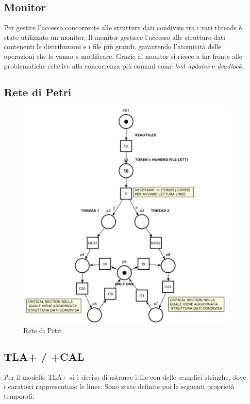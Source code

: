 \documentclass{article}
\begin{document}
\subsection{Monitor}
Per gestire l'accesso concorrente alle strutture dati condivise tra i vari threads è stato utilizzato un monitor.
Il monitor gestisce l'accesso alle strutture dati contenenti le distribuzioni e i file più grandi, garantendo l'atomicità delle operazioni che le vanno a modificare.
Grazie al monitor si riesce a far fronte alle problematiche relative alla concorrenza più comuni come \textit{lost updates} e \textit{deadlock}.


\clearpage
\subsection{Rete di Petri}

\begin{figure}[h]
	\centering
	\includegraphics[width=1\linewidth]{petri-net.png}
	\caption{Rete di Petri}
	\label{fig:petri-net}
\end{figure}

\subsection{TLA+ / +CAL}
Per il modello TLA+ si è deciso di astrarre i file con delle semplici stringhe, dove i caratteri rappresentano le linee.
Sono state definite poi le seguenti proprietà temporali:
\end{document}
